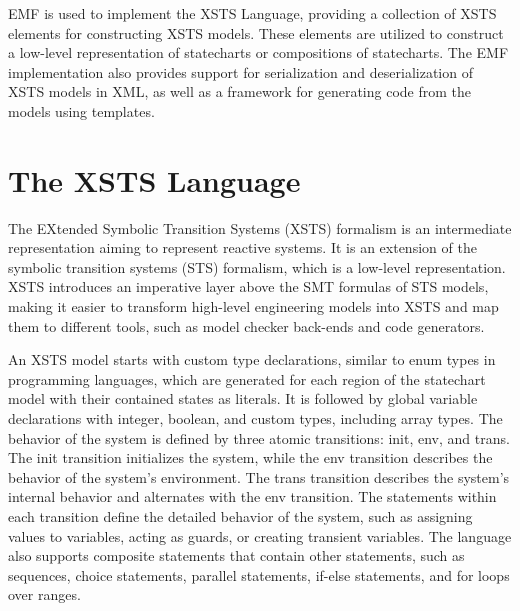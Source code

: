 EMF is used to implement the XSTS Language, providing a collection of XSTS elements for constructing XSTS models. These elements are utilized to construct a low-level representation of statecharts or compositions of statecharts. The EMF implementation also provides support for serialization and deserialization of XSTS models in XML, as well as a framework for generating code from the models using templates.

\section{The XSTS Language}

The EXtended Symbolic Transition Systems (XSTS) formalism is an intermediate representation aiming to represent reactive systems. It is an extension of the symbolic transition systems (STS) formalism, which is a low-level representation. XSTS introduces an imperative layer above the SMT formulas of STS models, making it easier to transform high-level engineering models into XSTS and map them to different tools, such as model checker back-ends and code generators.

An XSTS model starts with custom type declarations, similar to enum types in programming languages, which are generated for each region of the statechart model with their contained states as literals. It is followed by global variable declarations with integer, boolean, and custom types, including array types. The behavior of the system is defined by three atomic transitions: init, env, and trans. The init transition initializes the system, while the env transition describes the behavior of the system's environment. The trans transition describes the system's internal behavior and alternates with the env transition. The statements within each transition define the detailed behavior of the system, such as assigning values to variables, acting as guards, or creating transient variables. The language also supports composite statements that contain other statements, such as sequences, choice statements, parallel statements, if-else statements, and for loops over ranges.